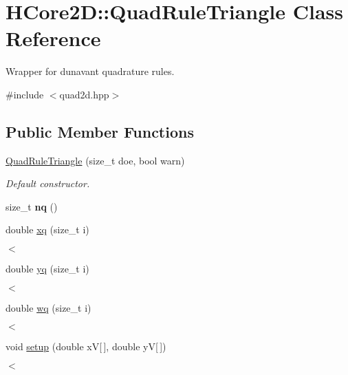 \hypertarget{classHCore2D_1_1QuadRuleTriangle}{}\section{H\+Core2D\+:\+:Quad\+Rule\+Triangle Class Reference}
\label{classHCore2D_1_1QuadRuleTriangle}


Wrapper for dunavant quadrature rules.  




{\ttfamily \#include $<$quad2d.\+hpp$>$}

\subsection*{Public Member Functions}
\begin{DoxyCompactItemize}
\item 
\hyperlink{classHCore2D_1_1QuadRuleTriangle_a83a432b56c03fffa615ec85f5dfd57d7}{Quad\+Rule\+Triangle} (size\+\_\+t doe, bool warn)
\begin{DoxyCompactList}\small\item\em Default constructor. \end{DoxyCompactList}\item 
\mbox{\label{classHCore2D_1_1QuadRuleTriangle_a5071f69f8f99171329a13943d5fe515d}} 
size\+\_\+t {\bfseries nq} ()
\item 
double \hyperlink{classHCore2D_1_1QuadRuleTriangle_a98156eda410a5aa6f9787ce920358fca}{xq} (size\+\_\+t i)
\begin{DoxyCompactList}\small\item\em $<$ \end{DoxyCompactList}\item 
\mbox{\label{classHCore2D_1_1QuadRuleTriangle_a0aa8f08c87bc5b2bc8180c149e16a4c2}} 
double \hyperlink{classHCore2D_1_1QuadRuleTriangle_a0aa8f08c87bc5b2bc8180c149e16a4c2}{yq} (size\+\_\+t i)
\begin{DoxyCompactList}\small\item\em $<$ \end{DoxyCompactList}\item 
\mbox{\label{classHCore2D_1_1QuadRuleTriangle_a47725c429eec36e849a8bbf69a924303}} 
double \hyperlink{classHCore2D_1_1QuadRuleTriangle_a47725c429eec36e849a8bbf69a924303}{wq} (size\+\_\+t i)
\begin{DoxyCompactList}\small\item\em $<$ \end{DoxyCompactList}\item 
void \hyperlink{classHCore2D_1_1QuadRuleTriangle_aa2cd3081837b1cb46f6573ceb16de7b2}{setup} (double xV\mbox{[}$\,$\mbox{]}, double yV\mbox{[}$\,$\mbox{]})
\begin{DoxyCompactList}\small\item\em $<$ \end{DoxyCompactList}\end{DoxyCompactItemize}


